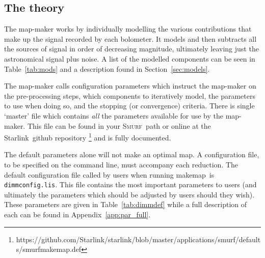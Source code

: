 \documentclass[twoside,11pt]{article}
\newcommand{\htmladdnormallink}[2]{#1}
\newcommand{\htmlref}[2]{#1}
\newenvironment{latexonly}{}{}
\newcommand{\latex}[1]{#1}
\newcommand{\latexhtml}[2]{#1}
\newcommand{\xref}[3]{#1}
\newcommand{\xlabel}[1]{}
\renewcommand{\_}{\texttt{\symbol{95}}}
\newcommand{\starlink}{\htmladdnormallink{Starlink}{http://starlink.jach.hawaii.edu}}
\newcommand{\smurf}{\xref{\textsc{Smurf}}{sun258}{}}
\newcommand{\task}[1]{\textsf{#1}}
\newcommand{\makemap}{\xref{\task{makemap}}{sun258}{MAKEMAP}}
\newcommand{\cref}[3]{\latexhtml{#1~\ref{#2}}{\htmlref{#3}{#2}}}
\begin{document}
\begin{latexonly}
\begin{table}
\begin{center}
\begin{footnotesize}
\end{footnotesize}
\end{center}
\end{table}

\renewcommand*\arraystretch{1.0}
\end{latexonly}

\subsection{\xlabel{dimm_theory}The theory}
\label{sec:dimm_theory}

The map-maker works by individually modelling the various
contributions that make up the signal recorded by each bolometer. It
models and then subtracts all the sources of signal in order of
decreasing magnitude, ultimately leaving just the astronomical signal
plus noise. A list of the modelled components can be seen in
\cref{Table}{tab:mods}{tabulated} and a description found in
\cref{Section}{sec:models}{The Individual Models}.

The map-maker calls configuration parameters which instruct the
map-maker on the pre-processing steps, which components to iteratively
model, the parameters to use when doing so, and the stopping (or
convergence) criteria. There is single `master' file which contains
\emph{all} the parameters available for use by the map-maker. This
file can be found in your \smurf\ path or online at the \starlink\
\htmladdnormallink{github repository}{https://github.com/Starlink/starlink/blob/master/applications/smurf/defaults/smurf\_makemap.def}
\latex{\footnote{https://github.com/Starlink/starlink/blob/master/applications/smurf/defaults/smurf\_makemap.def}}
 and is fully documented.

The default parameters alone will not make an optimal map. A
configuration file, to be specified on the command line, must
accompany each reduction. The default configuration file called by
users when running \makemap\ is \texttt{dimmconfig.lis}. This file
contains the most important parameters to users (and ultimately the
parameters which should be adjusted by users should they wish). These
parameters are given in \cref{Table}{tab:dimmdef}{a following table}
while a full description of each can be found in
\cref{Appendix}{app:par_full}{an appendix}.
\end{document}
